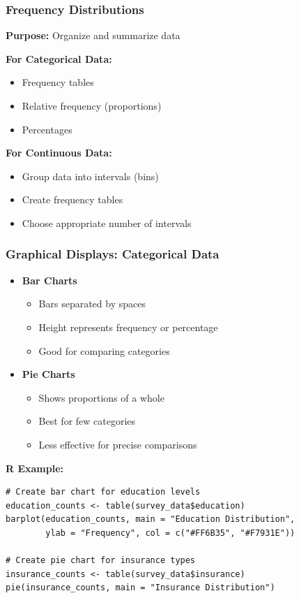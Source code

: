 \documentclass{beamer}
\begin{document}
\begin{frame}
\frametitle{Frequency Distributions}
\textbf{Purpose:} Organize and summarize data

\vspace{0.5cm}
\textbf{For Categorical Data:}
\begin{itemize}
\item Frequency tables
\item Relative frequency (proportions)
\item Percentages
\end{itemize}

\vspace{0.5cm}
\textbf{For Continuous Data:}
\begin{itemize}
\item Group data into intervals (bins)
\item Create frequency tables
\item Choose appropriate number of intervals
\end{itemize}
\end{frame}

\begin{frame}[fragile]
\frametitle{Graphical Displays: Categorical Data}
\begin{itemize}
\item \textbf{Bar Charts}
  \begin{itemize}
  \item Bars separated by spaces
  \item Height represents frequency or percentage
  \item Good for comparing categories
  \end{itemize}
\item \textbf{Pie Charts}
  \begin{itemize}
  \item Shows proportions of a whole
  \item Best for few categories
  \item Less effective for precise comparisons
  \end{itemize}
\end{itemize}

\vspace{0.3cm}
\textbf{R Example:}
\small
\begin{verbatim}
# Create bar chart for education levels
education_counts <- table(survey_data$education)
barplot(education_counts, main = "Education Distribution",
        ylab = "Frequency", col = c("#FF6B35", "#F7931E"))

# Create pie chart for insurance types
insurance_counts <- table(survey_data$insurance)
pie(insurance_counts, main = "Insurance Distribution")
\end{verbatim}
\end{frame}
\end{document}
